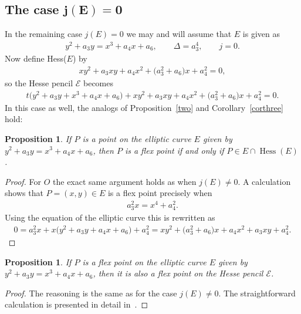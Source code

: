 \documentclass[pdftex]{sigma}
\numberwithin{equation}{section}
\newtheorem{Proposition}[Theorem]{Proposition}
\begin{document}
\subsection[The case $j(E) =0$]{The case $\boldsymbol{j(E) =0}$}\label{8.3}
In the remaining case $j(E)=0$ we may and will assume that $E$ is given as
\begin{gather*}y^2 +a_3y=x^3+a_4x+a_6, \qquad \Delta=a_3^4, \qquad j=0.\end{gather*}
Now define Hess($E$) by
\begin{gather*}xy^2 + a_3 xy+ a_4 x^2 + \big(a_3^2 + a_6\big)x + a_4^2=0,\end{gather*}
so the Hesse pencil $\mathcal{E}$ becomes
\begin{gather*}t\big(y^2 +a_3y + x^3+a_4x+a_6\big) + xy^2 + a_3 xy+ a_4 x^2 + \big(a_3^2 + a_6\big)x + a_4^2 =0.\end{gather*}
In this case as well, the analogs of Proposition~\ref{two} and Corollary~\ref{corthree} hold:

\begin{Proposition}If $P$ is a point on the elliptic curve $E$ given by $y^2+a_3y=x^3+a_4x+a_6$, then $P$ is a flex point if and only if $P \in E \cap \operatorname{Hess}(E)$.
\end{Proposition}

\begin{proof}For $O$ the exact same argument holds as when $j(E)\neq 0$. A calculation shows that $P=(x,y)\in E$ is a flex point precisely when
\begin{gather*}%
a_3^2x = x^4 + a_4^2.\end{gather*}
Using the equation of the elliptic curve this is rewritten as
\begin{gather*}
0= a_3^2x + x\big(y^2 + a_3y + a_4x + a_6\big) + a_4^2 = xy^2 + \big(a_3^2+a_6\big)x + a_4x^2 + a_3xy + a_4^2.\tag*{\qed}
\end{gather*}\renewcommand{\qed}{}
\end{proof}

\begin{Proposition} If $P$ is a flex point on the elliptic curve $E$ given by $y^2+a_3y=x^3+a_4x+a_6$, then it is also a flex point on the Hesse pencil $\mathcal{E}$.
\end{Proposition}

\begin{proof}The reasoning is the same as for the case $j(E) \neq 0$. The straightforward calculation is presented in detail in~\cite{tuijp2015}.
\end{proof}
\end{document}
